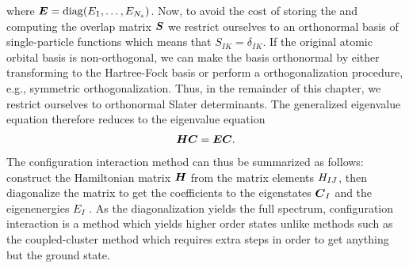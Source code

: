         where $\boldsymbol{E} = \operatorname{diag}(E_1, \dots, E_{N_s})$.
        Now, to avoid the cost of storing the and computing the overlap matrix
        $\boldsymbol{S}$ we restrict ourselves to an orthonormal basis of
        single-particle functions which means that $S_{IK} = \delta_{IK}$.
        If the original atomic orbital basis is non-orthogonal, we can make the
        basis orthonormal by either transforming to the Hartree-Fock basis or
        perform a orthogonalization procedure, e.g., symmetric
        orthogonalization.
        Thus, in the remainder of this chapter, we restrict ourselves to
        orthonormal Slater determinants.
        The generalized eigenvalue equation therefore reduces to the eigenvalue
        equation
        \begin{align}
            \boldsymbol{H}\boldsymbol{C} = \boldsymbol{E}\boldsymbol{C}.
        \end{align}
        The configuration interaction method can thus be summarized as follows:
        construct the Hamiltonian matrix $\boldsymbol{H}$ from the matrix elements
        $H_{IJ}$, then diagonalize the matrix to get the coefficients to
        the eigenstates $\boldsymbol{C}_I$ and the eigenenergies $E_I$
        \cite{karwowski}.
        As the diagonalization yields the full spectrum, configuration
        interaction is a method which yields higher order states unlike methods
        such as the coupled-cluster method which requires extra steps in order
        to get anything but the ground state.

